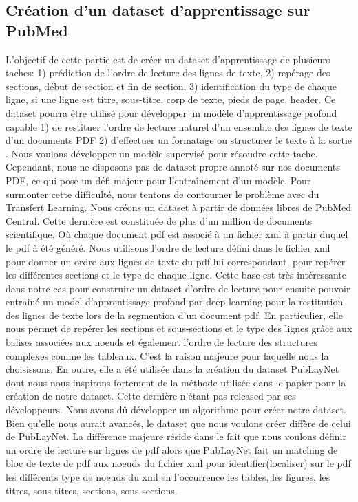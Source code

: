 \documentclass{report}
\begin{document}
\begin{multicols}{2}
    \section{Création d'un dataset d'apprentissage sur PubMed}
    L'objectif de cette partie est de créer un dataset d’apprentissage de plusieurs taches: 1) prédiction de l’ordre de lecture des lignes de texte, 2) repérage des sections, début de section et fin de section, 3) identification du type de chaque ligne, si une ligne est titre, sous-titre, corp de texte, pieds de page, header.
    \hspace{0.1em} Ce dataset pourra être utilisé pour développer un modèle d'apprentissage profond capable 1) de restituer l'ordre de lecture naturel d'un ensemble des lignes de texte d’un documents PDF 2) d’effectuer un formatage ou structurer le texte à la sortie .
    \hspace{0.1em} Nous voulons développer un modèle supervisé pour résoudre cette tache. Cependant, nous ne disposons pas de dataset propre annoté sur nos documents PDF, ce qui pose un défi majeur pour l'entraînement d’un modèle. Pour surmonter cette difficulté, nous tentons de contourner le problème avec du Transfert Learning. Nous créons un dataset à partir de données libres de PubMed Central. Cette dernière est constituée de plus d’un million de documents scientifique. Où chaque document pdf est associé à un fichier xml à partir duquel le pdf à été généré. Nous utilisons l’ordre de lecture défini dans le fichier xml pour donner un ordre aux lignes de texte du pdf lui correspondant, pour repérer les différentes sections et le type de chaque ligne. Cette base est très intéressante dans notre cas pour construire un dataset d’ordre de lecture pour ensuite pouvoir entrainé un model d’apprentissage profond par deep-learning pour la restitution des lignes de texte lors de la segmention d’un document pdf. En particulier, elle nous permet de repérer les sections et sous-sections et le type des lignes grâce aux balises associées aux noeuds et également l’ordre de lecture des structures complexes comme les tableaux. C’est la raison majeure pour laquelle nous la choisissons. En outre, elle a été utilisée dans la création du dataset PubLayNet dont nous nous inspirons fortement de la méthode utilisée dans le papier pour la création de notre dataset. Cette dernière n’étant pas released par ses développeurs. Nous avons dû développer un algorithme pour créer notre dataset. Bien qu’elle nous aurait avancés, le dataset que nous voulons créer diffère de celui de PubLayNet. La différence majeure réside dans le fait que nous voulons définir un ordre de lecture sur lignes de pdf alors que PubLayNet fait un matching de bloc de texte de pdf aux noeuds du fichier xml pour identifier(localiser) sur le pdf les différents type de noeuds du xml en l'occurrence les tables, les figures, les titres, sous titres, sections, sous-sections.

\end{multicols}
\end{document}
